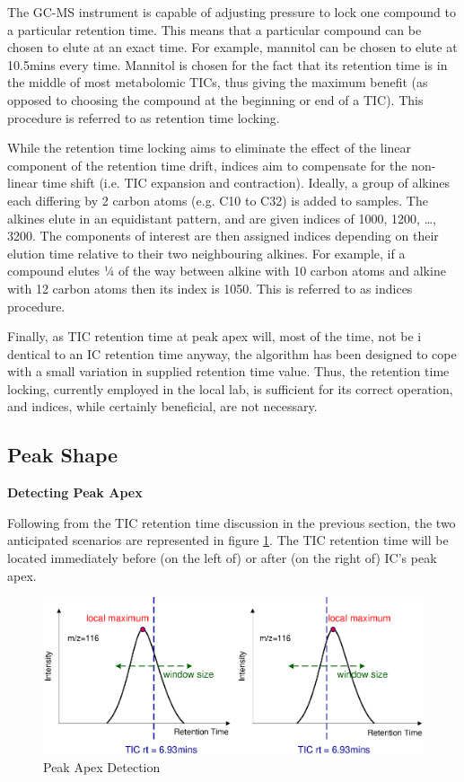 The GC-MS instrument is capable of adjusting pressure to lock one compound to a 
particular retention time. This means that a particular compound can be chosen 
to elute at an exact time. For example, mannitol can be chosen to elute 
at 10.5mins every time. Mannitol is chosen for the fact that its retention time 
is in the middle of most metabolomic TICs, thus giving the maximum benefit (as 
opposed to choosing the compound at the beginning or end of a TIC). This 
procedure is referred to as retention time locking.

While the retention time locking aims to eliminate the effect of the linear 
component of the retention time drift, indices aim to compensate for the 
non-linear time shift (i.e. TIC expansion and contraction). Ideally, a group 
of alkines each differing by 2 carbon atoms (e.g. C10 to C32) is added to 
samples. The alkines elute in an equidistant pattern, and are given indices of 
1000, 1200, …, 3200. The components of interest are then assigned indices 
depending on their elution time relative to their two neighbouring alkines. For 
example, if a compound elutes ¼ of the way between alkine with 10 carbon atoms 
and alkine with 12 carbon atoms then its index is 1050. This is referred to as 
indices procedure.

Finally, as TIC retention time at peak apex will, most of the time, not be i
dentical to an IC retention time anyway, the algorithm has been designed to 
cope with a small variation in supplied retention time value. Thus, the 
retention time locking, currently employed in the local lab, is sufficient 
for its correct operation, and indices, while certainly beneficial, are not 
necessary.

\subsection{Peak Shape}

{\bf Detecting Peak Apex}

Following from the TIC retention time discussion in the previous section,
the two anticipated scenarios are represented in figure \ref{fig:83}. The
TIC retention time will be located immediately before (on the left of)
or after (on the right of) IC’s peak apex.

\begin{figure}
  \begin{center}
    \includegraphics[scale=0.7]{graphics/chapter08/83.eps}
  \end{center}
  \caption{Peak Apex Detection}
  \label{fig:83}
\end{figure}

